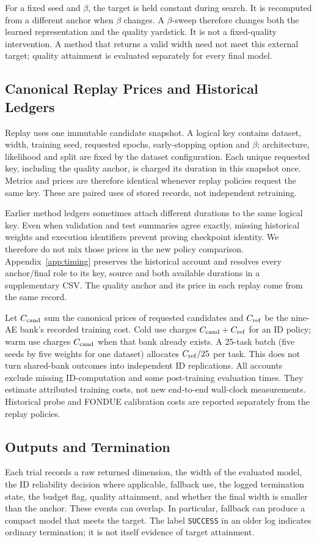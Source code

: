 For a fixed seed and $\beta$, the target is held constant during search.
It is recomputed from a different anchor when $\beta$ changes. A
$\beta$-sweep therefore changes both the learned representation and the
quality yardstick. It is not a fixed-quality intervention. A method that
returns a valid width need not meet this external target; quality
attainment is evaluated separately for every final model.

\subsection{Canonical Replay Prices and Historical Ledgers}\label{sec:cost}
Replay uses one immutable candidate snapshot. A logical key contains
dataset, width, training seed, requested epochs, early-stopping option and
$\beta$; architecture, likelihood and split are fixed by the dataset
configuration. Each unique requested key, including the quality anchor,
is charged its duration in this snapshot once. Metrics and prices are
therefore identical whenever replay policies request the same key.
These are paired uses of stored records, not independent retraining.

Earlier method ledgers sometimes attach different durations to the same
logical key. Even when validation and test summaries agree exactly,
missing historical weights and execution identifiers prevent proving
checkpoint identity. We therefore do not mix those prices in the new
policy comparison. Appendix~\ref{app:timing} preserves the historical
account and resolves every anchor/final role to its key, source and both
available durations in a supplementary CSV. The quality anchor and its
price in each replay come from the same record.

Let $C_{\rm cand}$ sum the canonical prices of requested candidates and
$C_{\rm ref}$ be the nine-AE bank's recorded training cost.
Cold use charges $C_{\rm cand}+C_{\rm ref}$ for an ID policy; warm use
charges $C_{\rm cand}$ when that bank already exists. A 25-task batch
(five seeds by five weights for one dataset) allocates $C_{\rm ref}/25$
per task. This does not turn shared-bank outcomes into independent ID
replications. All accounts exclude missing ID-computation and some
post-training evaluation times. They estimate attributed training costs,
not new end-to-end wall-clock measurements. Historical probe and FONDUE
calibration costs are reported separately from the replay policies.

\subsection{Outputs and Termination}\label{sec:outcomes}
Each trial records a raw returned dimension, the width of the evaluated
model, the ID reliability decision where applicable, fallback use, the
logged termination state, the budget flag, quality attainment, and whether
the final width is smaller than the anchor. These events can overlap.
In particular, fallback can produce a compact model that meets the target.
The label \texttt{SUCCESS} in an older log indicates ordinary termination;
it is not itself evidence of target attainment.

